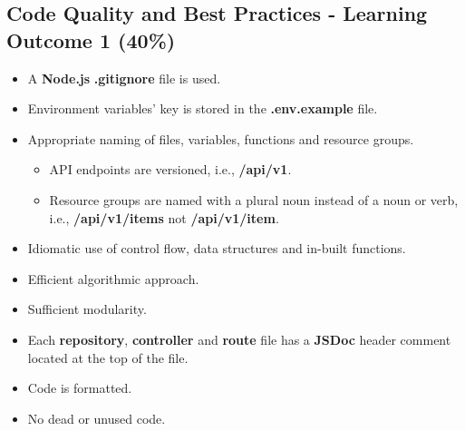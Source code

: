 \documentclass{article}
\begin{document}
\subsection*{Code Quality and Best Practices - Learning Outcome 1 (40\%)}
\begin{itemize}
	\item A \textbf{Node.js} \textbf{.gitignore} file is used.
	\item Environment variables' key is stored in the \textbf{.env.example} file. 
  	\item Appropriate naming of files, variables, functions and resource groups.
  	\begin{itemize}
		\item API endpoints are versioned, i.e., \textbf{/api/v1}.
		\item Resource groups are named with a plural noun instead of a noun or verb, i.e., \textbf{/api/v1/items} not \textbf{/api/v1/item}.
  	\end{itemize}
	\item Idiomatic use of control flow, data structures and in-built functions.
	\item Efficient algorithmic approach.
	\item Sufficient modularity.
	\item Each \textbf{repository}, \textbf{controller} and \textbf{route} file has a \textbf{JSDoc} header comment located at the top of the file.
	\item Code is formatted.
	\item No dead or unused code. 
\end{itemize}
\end{document}
